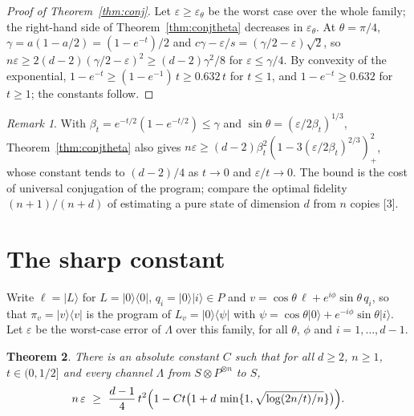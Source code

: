 \documentclass[11pt]{article}
\newtheorem{theorem}{Theorem}
\theoremstyle{remark}
\newtheorem{remark}[theorem]{Remark}
\newcommand{\ket}[1]{\lvert #1 \rangle}
\newcommand{\bra}[1]{\langle #1 \rvert}
\newcommand{\proj}[1]{\lvert #1 \rangle\langle #1 \rvert}
\begin{document}
\begin{proof}[Proof of Theorem~\ref{thm:conj}]
Let $\varepsilon \ge \varepsilon_\theta$ be the worst case over the whole family; the right-hand side of Theorem~\ref{thm:conjtheta} decreases in $\varepsilon_\theta$. At $\theta = \pi/4$, $\gamma = a(1-a/2) = (1-e^{-t})/2$ and $c\gamma - \varepsilon/s = (\gamma/2 - \varepsilon)\sqrt{2}$, so $n\varepsilon \ge 2(d-2)(\gamma/2 - \varepsilon)^2 \ge (d-2)\gamma^2/8$ for $\varepsilon \le \gamma/4$. By convexity of the exponential, $1 - e^{-t} \ge (1 - e^{-1})\,t \ge 0.632\,t$ for $t \le 1$, and $1 - e^{-t} \ge 0.632$ for $t \ge 1$; the constants follow.
\end{proof}

\begin{remark}
With $\beta_t = e^{-t/2}(1-e^{-t/2}) \le \gamma$ and $\sin\theta = (\varepsilon/2\beta_t)^{1/3}$, Theorem~\ref{thm:conjtheta} also gives $n\varepsilon \ge (d-2)\beta_t^2(1 - 3(\varepsilon/2\beta_t)^{2/3})_+^2$, whose constant tends to $(d-2)/4$ as $t \to 0$ and $\varepsilon/t \to 0$. The bound is the cost of universal conjugation of the program; compare the optimal fidelity $(n+1)/(n+d)$ of estimating a pure state of dimension $d$ from $n$ copies [3].
\end{remark}

\section{The sharp constant}\label{sec:sharp}

Write $\ell = \ket{L}$ for $L = \proj{0}$, $q_i = \ket{0}\ket{i}\in P$ and $v = \cos\theta\,\ell + e^{i\phi}\sin\theta\, q_i$, so that $\pi_v = \proj{v}$ is the program of $L_v = \ket{0}\bra{\psi}$ with $\psi = \cos\theta\ket{0} + e^{-i\phi}\sin\theta\ket{i}$. Let $\varepsilon$ be the worst-case error of $\Lambda$ over this family, for all $\theta$, $\phi$ and $i = 1, \dots, d-1$.

\begin{theorem}\label{thm:sharpfull}
There is an absolute constant $C$ such that for all $d \ge 2$, $n \ge 1$, $t \in (0, 1/2]$ and every channel $\Lambda$ from $S\otimes P^{\otimes n}$ to $S$,
\[
n\,\varepsilon \ \ge\ \frac{d-1}{4}\, t^2 \Bigl(1 - Ct\bigl(1 + d\,\min\{1, \sqrt{\log(2n/t)/n}\}\bigr)\Bigr).
\]
\end{theorem}
\end{document}
